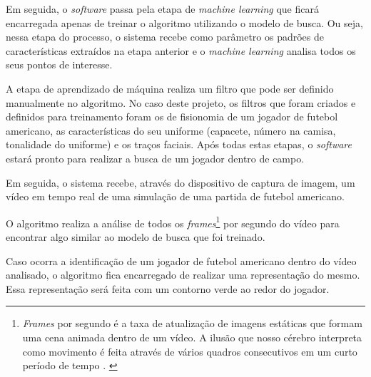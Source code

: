 Em seguida, o \textit{software} passa pela etapa de \textit{machine learning} que ficará encarregada apenas de treinar o algoritmo utilizando o modelo de busca. Ou seja, nessa etapa do processo, o sistema recebe como parâmetro os padrões de características extraídos na etapa anterior e o \textit{machine learning} analisa todos os seus pontos de interesse.

A etapa de aprendizado de máquina realiza um filtro que pode ser definido manualmente no algoritmo. No caso deste projeto, os filtros que foram criados e definidos para treinamento foram os de fisionomia de um jogador de futebol americano, as características do seu uniforme (capacete, número na camisa, tonalidade do uniforme) e os traços faciais. Após todas estas etapas, o \textit{software} estará pronto para realizar a busca de um jogador dentro de campo.

Em seguida, o sistema recebe, através do dispositivo de captura de imagem, um vídeo em tempo real de uma simulação de uma partida de futebol americano.

O algoritmo realiza a análise de todos os \textit{frames}\footnote{\textit{Frames} por segundo é a taxa de atualização de imagens estáticas que formam uma cena animada dentro de um vídeo. A ilusão que nosso cérebro interpreta como movimento é feita através de vários quadros consecutivos em um curto período de tempo \cite{FRAMES2011}. \label{frames-por-segundo}} por segundo do vídeo para encontrar algo similar ao modelo de busca que foi treinado.

Caso ocorra a identificação de um jogador de futebol americano dentro do vídeo analisado, o algoritmo fica encarregado de realizar uma representação do mesmo. Essa representação será feita com um contorno verde ao redor do jogador.